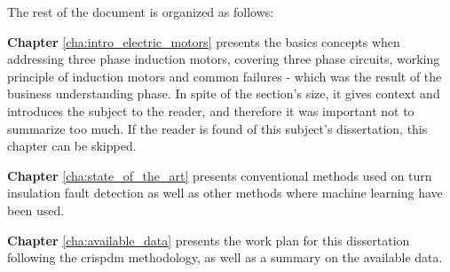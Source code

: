 The rest of the document is organized as follows:

\textbf{Chapter} \ref{cha:intro_electric_motors} presents the basics concepts when addressing three phase induction motors, covering three phase circuits, working principle of induction motors and common failures - which was the result of the business understanding phase. In spite of the section's size, it gives context and introduces the subject to the reader, and therefore it was important not to summarize too much. If the reader is found of this subject's dissertation, this chapter can be skipped.

\textbf{Chapter} \ref{cha:state_of_the_art} presents conventional methods used on turn insulation fault detection as well as other methods where machine learning have been used.

\textbf{Chapter} \ref{cha:available_data} presents the work plan for this dissertation following the \acrshort{crispdm} methodology, as well as a summary on the available data.
